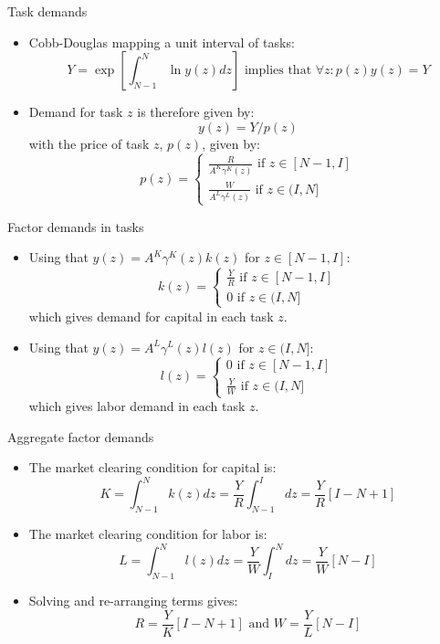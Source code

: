 \documentclass[notes=show]{beamer}
\begin{document}
\begin{frame}{Task demands}
\begin{itemize}
\item Cobb-Douglas mapping a unit interval of tasks:
\[
Y= \exp \left[ \int_{N-1}^{N} \ln y(z)dz \right] \text{ implies that } \forall z: p(z)y(z) = Y
\] 
\item Demand for task $z$ is therefore given by:
\[
y(z) = Y / p(z)
\] 
with the price of task $z$, $p(z)$, given by:
\[
p(z) = 
\begin{cases}
\frac{R}{A^{K} \gamma^{K}(z)} \text{ if } z \in [N-1,I] \\
\frac{W}{A^{L} \gamma^{L}(z)} \text{ if } z \in (I,N] 
\end{cases}
\]
\end{itemize}
\end{frame}

\begin{frame}{Factor demands in tasks}
\begin{itemize}
\item Using that $y(z) = A^{K} \gamma^{K}(z)k(z)$ for $z \in [N-1,I]$:
\[
k(z)=
\begin{cases}
\frac{Y}{R} \text{ if } z \in [N-1,I] \\
0 \text{ if } z \in (I,N]
\end{cases}
\]
which gives demand for capital in each task $z$. \medskip
\item Using that $y(z) = A^{L} \gamma^{L}(z)l(z)$ for $z \in (I,N]$:
\[
l(z)=
\begin{cases}
0 \text{ if } z \in [N-1,I] \\
\frac{Y}{W} \text{ if } z \in (I,N]
\end{cases}
\]
which gives labor demand in each task $z$.
\end{itemize}
\end{frame}

\begin{frame}{Aggregate factor demands}
\begin{itemize}
\item The market clearing condition for capital is:
\[
K = \int_{N-1}^{N} k(z)dz = \frac{Y}{R} \int_{N-1}^{I} dz = \frac{Y}{R}[I-N+1] 
\]
\item The market clearing condition for labor is:
\[
L = \int_{N-1}^{N} l(z)dz = \frac{Y}{W}  \int_{I}^{N} dz = \frac{Y}{W}[N-I]
\]
\item Solving and re-arranging terms gives:
\[
R = \frac{Y}{K}[I-N+1] \text{ and }  W = \frac{Y}{L}[N-I]
\]
\end{itemize}
\end{frame}
\end{document}
